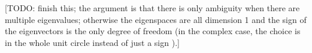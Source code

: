 \documentclass[
  12pt,
  paper=a4,
]{scrartcl} %
\begin{document}









[TODO: finish this; the argument is that there is only ambiguity when there are multiple eigenvalues; otherwise the eigenspaces are all dimension 1 and the sign of the eigenvectors is the only degree of freedom (in the complex case, the choice is in the whole unit circle instead of just a sign ).]


\end{document}
